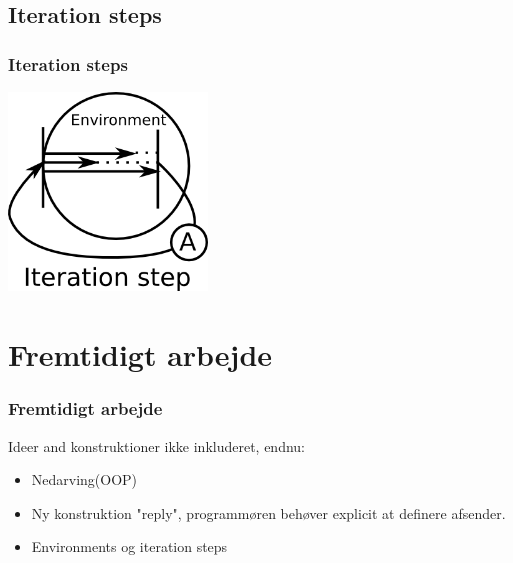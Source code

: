 \subsection{Iteration steps}
\begin{frame}
  \frametitle{Iteration steps}
  \includegraphics[width=200px]{Images/iteration.png}
\end{frame}

\section{Fremtidigt arbejde}
\begin{frame}
	\frametitle{Fremtidigt arbejde}
	Ideer and konstruktioner ikke inkluderet, endnu: 
  \begin{itemize}
    \item Nedarving(OOP)
    \item Ny konstruktion "reply", programmøren behøver explicit at definere afsender.
    \item Environments og iteration steps
  \end{itemize}
\end{frame}
